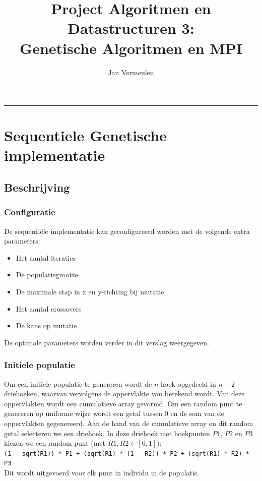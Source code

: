 \documentclass[]{article}
\begin{document}
\title{Project Algoritmen en Datastructuren 3: \\Genetische Algoritmen en MPI}
\author{Jan Vermeulen}
\maketitle

\hrule

\section{Sequentiele Genetische implementatie}
\subsection{Beschrijving}

\subsubsection{Configuratie}
De sequenti\"ele implementatie kan geconfigureerd worden met de volgende extra parameters:
\begin{itemize}
\item Het aantal iteraties
\item De populatiegrootte
\item De maximale stap in x en y-richting bij mutatie
\item Het aantal crossovers
\item De kans op mutatie
\end{itemize}
De optimale parameters worden verder in dit verslag weergegeven.

\subsubsection{Initiele populatie}
Om een initiele populatie te genereren wordt de $n$-hoek opgedeeld in $n-2$ driehoeken, waarvan vervolgens de oppervlakte van berekend wordt.
Van deze oppervlakten wordt een cumulatieve array gevormd. Om een random punt te genereren op uniforme wijze wordt een getal tussen 0 en de som van de oppervlakten gegenereerd.
Aan de hand van de cumulatieve array en dit random getal selecteren we een driehoek. In deze driehoek met hoekpunten $P1$, $P2$ en $P3$ kiezen we een random punt (met $R1, R2 \in [0,1])$:\\[5pt]
\texttt{(1 - sqrt(R1)) * P1 + (sqrt(R1) * (1 - R2)) * P2 + (sqrt(R1) * R2) * P3}\\[5pt]
Dit wordt uitgevoerd voor elk punt in individu in de populatie.
\end{document}
